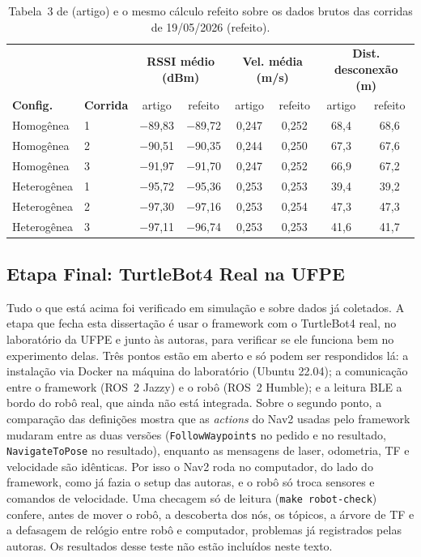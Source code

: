 \begin{table}[H]
\centering
\caption{Tabela~3 de  (artigo) e o mesmo cálculo refeito sobre os dados brutos das corridas de 19/05/2026 (refeito).}
\label{tab:cbsoft_tabela3}
\small\setlength{\tabcolsep}{3pt}
\begin{tabular}{llcccccc}
\toprule
 & & \multicolumn{2}{c}{\textbf{RSSI médio (dBm)}} & \multicolumn{2}{c}{\textbf{Vel. média (m/s)}} & \multicolumn{2}{c}{\textbf{Dist. desconexão (m)}} \\
\textbf{Config.} & \textbf{Corrida} & artigo & refeito & artigo & refeito & artigo & refeito \\
\midrule
Homogênea   & 1 & $-$89,83 & $-$89,72 & 0,247 & 0,252 & 68,4 & 68,6 \\
Homogênea   & 2 & $-$90,51 & $-$90,35 & 0,244 & 0,250 & 67,3 & 67,6 \\
Homogênea   & 3 & $-$91,97 & $-$91,70 & 0,247 & 0,252 & 66,9 & 67,2 \\
Heterogênea & 1 & $-$95,72 & $-$95,36 & 0,253 & 0,253 & 39,4 & 39,2 \\
Heterogênea & 2 & $-$97,30 & $-$97,16 & 0,253 & 0,254 & 47,3 & 47,3 \\
Heterogênea & 3 & $-$97,11 & $-$96,74 & 0,253 & 0,253 & 41,6 & 41,7 \\
\bottomrule
\end{tabular}
\end{table}

\subsection{Etapa Final: TurtleBot4 Real na UFPE}

Tudo o que está acima foi verificado em simulação e sobre dados já
coletados. A etapa que fecha esta dissertação é usar o framework com o
TurtleBot4 real, no laboratório da UFPE e junto às autoras, para verificar
se ele funciona bem no experimento delas. Três pontos estão em aberto e só
podem ser respondidos lá: a instalação via Docker na máquina do laboratório
(Ubuntu 22.04); a comunicação entre o framework (ROS~2 Jazzy) e o robô
(ROS~2 Humble); e a leitura BLE a bordo do robô real, que ainda não está
integrada. Sobre o segundo ponto, a comparação das definições mostra que as
\textit{actions} do Nav2 usadas pelo framework mudaram entre as duas versões
(\texttt{FollowWaypoints} no pedido e no resultado, \texttt{NavigateToPose}
no resultado), enquanto as mensagens de laser, odometria, TF e velocidade
são idênticas. Por isso o Nav2 roda no computador, do lado do framework, como
já fazia o setup das autoras, e o robô só troca sensores e comandos de
velocidade. Uma checagem só de leitura (\texttt{make robot-check}) confere,
antes de mover o robô, a descoberta dos nós, os tópicos, a árvore de TF e a
defasagem de relógio entre robô e computador, problemas já registrados pelas
autoras. Os resultados desse teste não estão incluídos neste texto.

